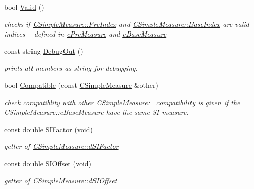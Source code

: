 \begin{DoxyCompactItemize}
bool \hyperlink{classCSimpleMeasure_ac4c8b1c22393c6d9a6381f3d8dfdf3e4}{Valid} ()
\begin{DoxyCompactList}\small\item\em checks if \hyperlink{classCSimpleMeasure_aa23ed9eec21adb9a97c90a424e7ee18a}{C\+Simple\+Measure\+::\+Pre\+Index} and \hyperlink{classCSimpleMeasure_a191dbfa4cc374946bf8a82111f827d92}{C\+Simple\+Measure\+::\+Base\+Index} are valid indices ~\newline
 defined in \hyperlink{PreMeasure_8h_a6c81167b8d4c2badde42f81cb7214620}{e\+Pre\+Measure} and \hyperlink{BaseMeasure_8h_ac90e5164ccf1f0d648fba7e94b229a11}{e\+Base\+Measure} \end{DoxyCompactList}\item 
const string \hyperlink{classCSimpleMeasure_a1031ddc7887dce1a739f38abe03601da}{Debug\+Out} ()
\begin{DoxyCompactList}\small\item\em prints all members as string for debugging. \end{DoxyCompactList}\item 
bool \hyperlink{classCSimpleMeasure_a0879e6127b863b5dfe4943e6b91695d2}{Compatible} (const \hyperlink{classCSimpleMeasure}{C\+Simple\+Measure} \&other)
\begin{DoxyCompactList}\small\item\em check compatiblity with other \hyperlink{classCSimpleMeasure}{C\+Simple\+Measure}\+:~\newline
 compatibility is given if the C\+Simple\+Measure\+::e\+Base\+Measure have the same SI measure. \end{DoxyCompactList}\item 
const double \hyperlink{classCSimpleMeasure_ad9c08324e46ef4eee5695e7ea1d00018}{S\+I\+Factor} (void)
\begin{DoxyCompactList}\small\item\em getter of \hyperlink{classCSimpleMeasure_a08be520f9d3a0e50cc63693f2fc607f2}{C\+Simple\+Measure\+::d\+S\+I\+Factor} \end{DoxyCompactList}\item 
const double \hyperlink{classCSimpleMeasure_a6e04ea2506105c069ae28650c5d69733}{S\+I\+Offset} (void)
\begin{DoxyCompactList}\small\item\em getter of \hyperlink{classCSimpleMeasure_a27c1637c744a79856ee81869e2aa8890}{C\+Simple\+Measure\+::d\+S\+I\+Offset} \end{DoxyCompactList}\item 

\end{DoxyCompactItemize}
